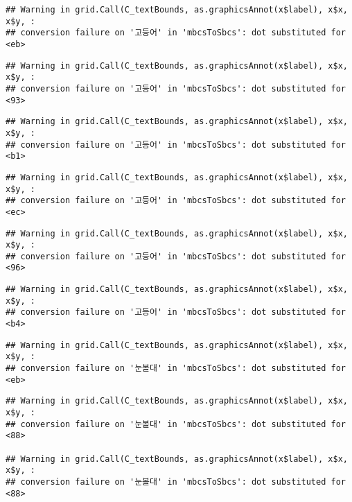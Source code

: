 \documentclass[
]{article}
\begin{document}
\begin{verbatim}
## Warning in grid.Call(C_textBounds, as.graphicsAnnot(x$label), x$x, x$y, :
## conversion failure on '고등어' in 'mbcsToSbcs': dot substituted for <eb>
\end{verbatim}

\begin{verbatim}
## Warning in grid.Call(C_textBounds, as.graphicsAnnot(x$label), x$x, x$y, :
## conversion failure on '고등어' in 'mbcsToSbcs': dot substituted for <93>
\end{verbatim}

\begin{verbatim}
## Warning in grid.Call(C_textBounds, as.graphicsAnnot(x$label), x$x, x$y, :
## conversion failure on '고등어' in 'mbcsToSbcs': dot substituted for <b1>
\end{verbatim}

\begin{verbatim}
## Warning in grid.Call(C_textBounds, as.graphicsAnnot(x$label), x$x, x$y, :
## conversion failure on '고등어' in 'mbcsToSbcs': dot substituted for <ec>
\end{verbatim}

\begin{verbatim}
## Warning in grid.Call(C_textBounds, as.graphicsAnnot(x$label), x$x, x$y, :
## conversion failure on '고등어' in 'mbcsToSbcs': dot substituted for <96>
\end{verbatim}

\begin{verbatim}
## Warning in grid.Call(C_textBounds, as.graphicsAnnot(x$label), x$x, x$y, :
## conversion failure on '고등어' in 'mbcsToSbcs': dot substituted for <b4>
\end{verbatim}

\begin{verbatim}
## Warning in grid.Call(C_textBounds, as.graphicsAnnot(x$label), x$x, x$y, :
## conversion failure on '눈볼대' in 'mbcsToSbcs': dot substituted for <eb>
\end{verbatim}

\begin{verbatim}
## Warning in grid.Call(C_textBounds, as.graphicsAnnot(x$label), x$x, x$y, :
## conversion failure on '눈볼대' in 'mbcsToSbcs': dot substituted for <88>

## Warning in grid.Call(C_textBounds, as.graphicsAnnot(x$label), x$x, x$y, :
## conversion failure on '눈볼대' in 'mbcsToSbcs': dot substituted for <88>
\end{verbatim}
\end{document}
